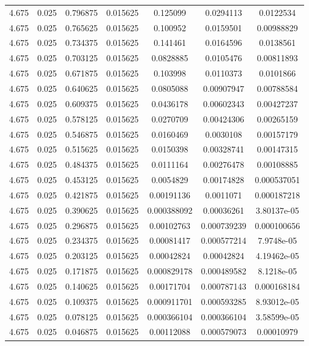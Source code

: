 \begin{flushleft}
\begin{longtable}{ccccccc}
4.675 & 0.025 & 0.796875 & 0.015625 & 0.125099 & 0.0294113 & 0.0122534  \\ 
4.675 & 0.025 & 0.765625 & 0.015625 & 0.100952 & 0.0159501 & 0.00988829  \\ 
4.675 & 0.025 & 0.734375 & 0.015625 & 0.141461 & 0.0164596 & 0.0138561  \\ 
4.675 & 0.025 & 0.703125 & 0.015625 & 0.0828885 & 0.0105476 & 0.00811893  \\ 
4.675 & 0.025 & 0.671875 & 0.015625 & 0.103998 & 0.0110373 & 0.0101866  \\ 
4.675 & 0.025 & 0.640625 & 0.015625 & 0.0805088 & 0.00907947 & 0.00788584  \\ 
4.675 & 0.025 & 0.609375 & 0.015625 & 0.0436178 & 0.00602343 & 0.00427237  \\ 
4.675 & 0.025 & 0.578125 & 0.015625 & 0.0270709 & 0.00424306 & 0.00265159  \\ 
4.675 & 0.025 & 0.546875 & 0.015625 & 0.0160469 & 0.0030108 & 0.00157179  \\ 
4.675 & 0.025 & 0.515625 & 0.015625 & 0.0150398 & 0.00328741 & 0.00147315  \\ 
4.675 & 0.025 & 0.484375 & 0.015625 & 0.0111164 & 0.00276478 & 0.00108885  \\ 
4.675 & 0.025 & 0.453125 & 0.015625 & 0.0054829 & 0.00174828 & 0.000537051  \\ 
4.675 & 0.025 & 0.421875 & 0.015625 & 0.00191136 & 0.0011071 & 0.000187218  \\ 
4.675 & 0.025 & 0.390625 & 0.015625 & 0.000388092 & 0.00036261 & 3.80137e-05  \\ 
4.675 & 0.025 & 0.296875 & 0.015625 & 0.00102763 & 0.000739239 & 0.000100656  \\ 
4.675 & 0.025 & 0.234375 & 0.015625 & 0.00081417 & 0.000577214 & 7.9748e-05  \\ 
4.675 & 0.025 & 0.203125 & 0.015625 & 0.00042824 & 0.00042824 & 4.19462e-05  \\ 
4.675 & 0.025 & 0.171875 & 0.015625 & 0.000829178 & 0.000489582 & 8.1218e-05  \\ 
4.675 & 0.025 & 0.140625 & 0.015625 & 0.00171704 & 0.000787143 & 0.000168184  \\ 
4.675 & 0.025 & 0.109375 & 0.015625 & 0.000911701 & 0.000593285 & 8.93012e-05  \\ 
4.675 & 0.025 & 0.078125 & 0.015625 & 0.000366104 & 0.000366104 & 3.58599e-05  \\ 
4.675 & 0.025 & 0.046875 & 0.015625 & 0.00112088 & 0.000579073 & 0.00010979  \\ 

\end{longtable}
\end{flushleft}
